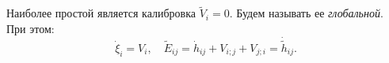 \documentclass[\docroot/reports/draft/report.tex]{subfiles}
\begin{document}
    Наиболее простой является калибровка $\tilde{V}_i = 0$. Будем называть ее \textit{глобальной}. При этом:
    \begin{equation}\label{eq:calibr-glob}
        \dot{\xi}_i = V_i, \quad \tilde{E}_{ij} = \dot{h}_{ij} + V_{i;j} + V_{j;i} = \dot{\tilde{h}}_{ij} .
    \end{equation}
\end{document}
